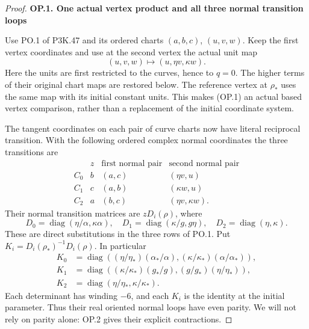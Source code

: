 \begin{proof}
\par

\medskip\noindent\textbf{OP.1. One actual vertex product and all three normal transition loops}

\par\nobreak

Use PO.1 of P3K.47 and its ordered charts \((a,b,c)\), \((u,v,w)\).
Keep the first vertex coordinates and use at the second vertex the
actual unit map
\[
                  (u,v,w)\longmapsto(u,\eta v,\kappa w).
                                                               \tag{OP.1}
\]
Here the units are first restricted to the curves, hence to \(q=0\).
The higher terms of their original chart maps are restored below.
The reference vertex at \(\rho_*\) uses the same map with its initial
constant units. This makes (OP.1) an actual based vertex comparison,
rather than a replacement of the initial coordinate system.

The tangent coordinates on each pair of curve charts now have literal
reciprocal transition. With the following ordered complex normal
coordinates the three transitions are
\[
 \begin{array}{c|c|c|c}
  &z&\text{first normal pair}&\text{second normal pair}\\ \hline
 C_0&b&(a,c)&(\eta v,u)\\
 C_1&c&(a,b)&(\kappa w,u)\\
 C_2&a&(b,c)&(\eta v,\kappa w).
 \end{array}
\]
Their normal transition matrices are \(zD_i(\rho)\), where
\[
 D_0=\operatorname{diag}(\eta/\alpha,\kappa\alpha),\quad
 D_1=\operatorname{diag}(\kappa/g,g\eta),\quad
 D_2=\operatorname{diag}(\eta,\kappa).                 \tag{OP.2}
\]
These are direct substitutions in the three rows of PO.1. Put
\(K_i=D_i(\rho_*)^{-1}D_i(\rho)\). In particular
\[
 \begin{aligned}
 K_0&=\operatorname{diag}
   ((\eta/\eta_*)(\alpha_*/\alpha),
             (\kappa/\kappa_*)(\alpha/\alpha_*)),\\
 K_1&=\operatorname{diag}
   ((\kappa/\kappa_*)(g_*/g),(g/g_*)(\eta/\eta_*)),\\
 K_2&=\operatorname{diag}(\eta/\eta_*,\kappa/\kappa_*).
 \end{aligned}                                               \tag{OP.3}
\]
Each determinant has winding \(-6\), and each \(K_i\) is the identity
at the initial parameter. Thus their real oriented normal loops have
even parity. We will not rely on parity alone: OP.2 gives their
explicit contractions.


\end{proof}
